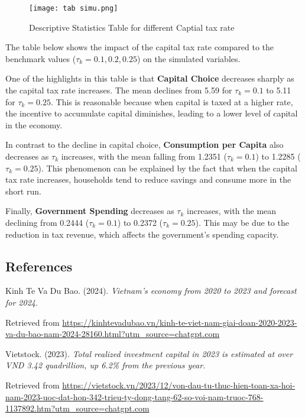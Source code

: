 \documentclass{article}
\begin{document}
\begin{figure}[H]
    \centering
    \texttt{[image: tab simu.png]}
    \caption{Descriptive Statistics Table for different Captial tax rate}
    \label{fig:gdp}
\end{figure}

The table below shows the impact of the capital tax rate compared to the benchmark values (\(\tau_k = 0.1, 0.2, 0.25\)) on the simulated variables.

One of the highlights in this table is that \textbf{Capital Choice} decreases sharply as the capital tax rate increases. The mean declines from 5.59 for \(\tau_k = 0.1\) to 5.11 for \(\tau_k = 0.25\). This is reasonable because when capital is taxed at a higher rate, the incentive to accumulate capital diminishes, leading to a lower level of capital in the economy.

In contrast to the decline in capital choice, \textbf{Consumption per Capita} also decreases as \(\tau_k\) increases, with the mean falling from 1.2351 (\(\tau_k = 0.1\)) to 1.2285 (\(\tau_k = 0.25\)). This phenomenon can be explained by the fact that when the capital tax rate increases, households tend to reduce savings and consume more in the short run.

Finally, \textbf{Government Spending} decreases as \(\tau_k\) increases, with the mean declining from 0.2444 (\(\tau_k = 0.1\)) to 0.2372 (\(\tau_k = 0.25\)). This may be due to the reduction in tax revenue, which affects the government's spending capacity.

\newpage
\begin{center}
    \section*{References}
\end{center}

Kinh Te Va Du Bao. (2024). \textit{Vietnam's economy from 2020 to 2023 and forecast for 2024}.  

Retrieved from \url{https://kinhtevadubao.vn/kinh-te-viet-nam-giai-doan-2020-2023-va-du-bao-nam-2024-28160.html?utm_source=chatgpt.com}

\vspace{1em}

Vietstock. (2023). \textit{Total realized investment capital in 2023 is estimated at over VND 3.42 quadrillion, up 6.2\% from the previous year}.  

Retrieved from \url{https://vietstock.vn/2023/12/von-dau-tu-thuc-hien-toan-xa-hoi-nam-2023-uoc-dat-hon-342-trieu-ty-dong-tang-62-so-voi-nam-truoc-768-1137892.htm?utm_source=chatgpt.com}
\end{document}
